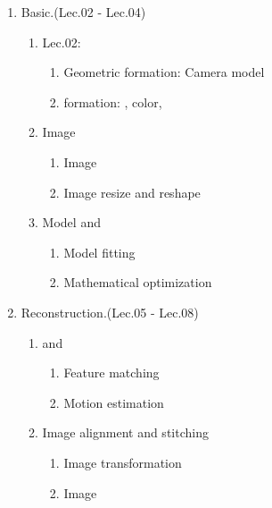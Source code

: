     \begin{enumerate}
        \item Basic.(Lec.02 - Lec.04)
        \begin{enumerate}
            \item Lec.02: 
            \begin{enumerate}
                \item Geometric formation: Camera model
                \item {} formation: , color, 
            \end{enumerate}
            \item Image 
            \begin{enumerate}
                \item Image 
                \item Image resize and reshape
            \end{enumerate}
            \item Model  and 
            \begin{enumerate}
                \item Model fitting
                \item Mathematical optimization
            \end{enumerate}
        \end{enumerate}
        \item Reconstruction.(Lec.05 - Lec.08)
        \begin{enumerate}
            \item {} and 
            \begin{enumerate}
                \item Feature matching
                \item Motion estimation
            \end{enumerate}
            \item Image alignment and stitching
            \begin{enumerate}
                \item Image transformation
                \item Image 
            \end{enumerate}

\end{enumerate}
\end{enumerate}
